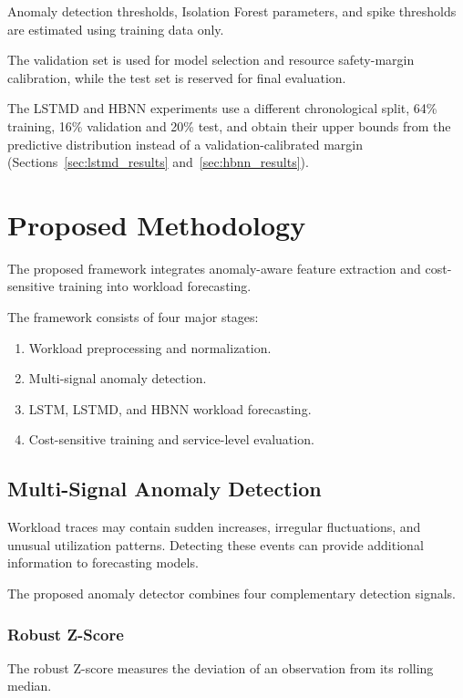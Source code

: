 \documentclass[conference]{IEEEtran}
\begin{document}
Anomaly detection thresholds, Isolation Forest parameters, and spike thresholds are estimated using training data only.

The validation set is used for model selection and resource safety-margin calibration, while the test set is reserved for final evaluation.

The LSTMD and HBNN experiments use a different chronological split, 64\% training, 16\% validation and 20\% test, and obtain their upper bounds from the predictive distribution instead of a validation-calibrated margin (Sections~\ref{sec:lstmd_results} and~\ref{sec:hbnn_results}).

\section{Proposed Methodology}

The proposed framework integrates anomaly-aware feature extraction and cost-sensitive training into workload forecasting.

The framework consists of four major stages:

\begin{enumerate}
\item Workload preprocessing and normalization.
\item Multi-signal anomaly detection.
\item LSTM, LSTMD, and HBNN workload forecasting.
\item Cost-sensitive training and service-level evaluation.
\end{enumerate}

\subsection{Multi-Signal Anomaly Detection}

Workload traces may contain sudden increases, irregular fluctuations, and unusual utilization patterns. Detecting these events can provide additional information to forecasting models.

The proposed anomaly detector combines four complementary detection signals.

\subsubsection{Robust Z-Score}

The robust Z-score measures the deviation of an observation from its rolling median.
\end{document}

